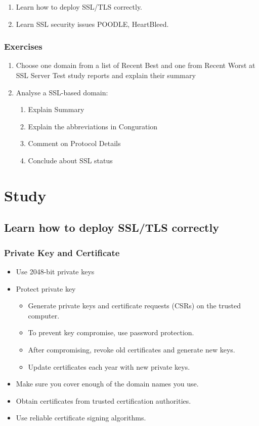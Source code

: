 \documentclass[14pt,a4paper,report]{report}
\begin{document}
\begin{enumerate}
	\item Learn how to deploy SSL/TLS correctly.
	\item Learn SSL security issues POODLE, HeartBleed.
\end{enumerate}

\subsubsection{Exercises}

\begin{enumerate}
	\item Choose one domain from a list of Recent Best and one from Recent Worst at SSL Server Test study reports and explain their summary
	\item Analyse a SSL-based domain:
	\begin{enumerate}
		\item Explain Summary
		\item Explain the abbreviations in Conguration
		\item Comment on Protocol Details
		\item Conclude about SSL status
	\end{enumerate}
\end{enumerate}

\clearpage

\section{Study}

\subsection{Learn how to deploy SSL/TLS correctly}

\subsubsection{Private Key and Certificate}

\begin{itemize}
	\item Use 2048-bit private keys
	\item Protect private key
	\begin{itemize}
		\item Generate private keys and certificate requests (CSRs) on the trusted computer.
		\item To prevent key compromise, use password protection.
		\item After compromising, revoke old certificates and generate new keys.
		\item Update certificates each year with new private keys.
	\end{itemize}
	\item Make sure you cover enough of the domain names you use.
	\item Obtain certificates from trusted certification authorities.
	\item Use reliable certificate signing algorithms.
\end{itemize}
\end{document}

